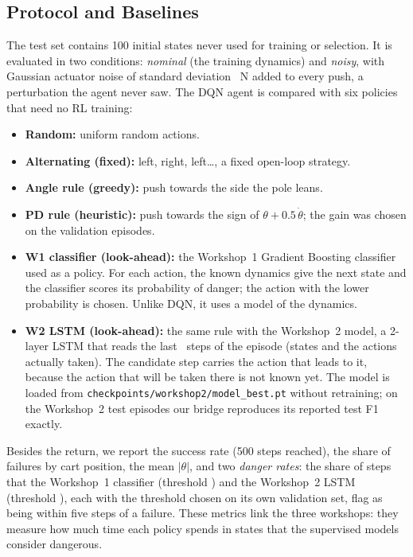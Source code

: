\documentclass[conference]{IEEEtran}
\begin{document}
\subsection{Protocol and Baselines}
The test set contains 100 initial states never used for training or selection. It is
evaluated in two conditions: \emph{nominal} (the training dynamics) and \emph{noisy},
with Gaussian actuator noise of standard deviation \NoiseStd~N added to every push, a
perturbation the agent never saw. The DQN agent is compared with six policies that
need no RL training:
\begin{itemize}
\item \textbf{Random:} uniform random actions.
\item \textbf{Alternating (fixed):} left, right, left\dots, a fixed open-loop strategy.
\item \textbf{Angle rule (greedy):} push towards the side the pole leans.
\item \textbf{PD rule (heuristic):} push towards the sign of $\theta + 0.5\,\dot\theta$; the gain was chosen on the validation episodes.
\item \textbf{W1 classifier (look-ahead):} the Workshop~1 Gradient Boosting classifier used as a policy. For each action, the known dynamics give the next state and the classifier scores its probability of danger; the action with the lower probability is chosen. Unlike DQN, it uses a model of the dynamics.
\item \textbf{W2 LSTM (look-ahead):} the same rule with the Workshop~2 model, a 2-layer LSTM that reads the last \WTwoWindow\ steps of the episode (states and the actions actually taken). The candidate step carries the action that leads to it, because the action that will be taken there is not known yet. The model is loaded from \texttt{checkpoints/workshop2/model\_best.pt} without retraining; on the Workshop~2 test episodes our bridge reproduces its reported test F1 exactly.
\end{itemize}

Besides the return, we report the success rate (500 steps reached), the share of
failures by cart position, the mean $|\theta|$, and two \emph{danger rates}: the share
of steps that the Workshop~1 classifier (threshold \WOneThreshold) and the Workshop~2
LSTM (threshold \WTwoThreshold), each with the threshold chosen on its own validation
set, flag as being within five steps of a failure. These metrics link the three
workshops: they measure how much time each policy spends in states that the supervised
models consider dangerous.
\end{document}
